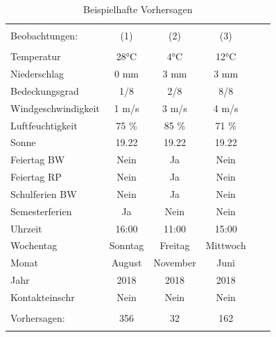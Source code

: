 \documentclass[a4paper,12pt]{thesis}
\begin{document}
\begin{table}[!htbp] \centering 
	\caption{Beispielhafte Vorhersagen} 
	\label{ForecastsExample} 
	\begin{tabular}{@{\extracolsep{-5pt}}lccccc} 
		\\[-1.8ex]\hline 
		\hline \\[-1.8ex] 
		Beobachtungen: & (1) & (2) & (3) \\ 
		\hline \\[-1.8ex] 
		Temperatur & 28°C & 4°C & 12°C\\
		Niederschlag & 0 mm & 3 mm &  3 mm\\
		Bedeckungsgrad & 1/8 & 2/8 & 8/8\\
		Windgeschwindigkeit &  1 m/s & 3 m/s & 4 m/s\\
		Luftfeuchtigkeit &  75 \% & 85 \% & 71 \% \\
		Sonne & 19.22 & 19.22 & 19.22\\
		Feiertag BW & Nein & Ja & Nein \\
		Feiertag RP & Nein & Ja & Nein \\
		Schulferien BW & Nein & Ja & Nein \\
		Semesterferien & Ja & Nein & Nein \\
		Uhrzeit & 16:00 & 11:00 & 15:00 \\
		Wochentag & Sonntag & Freitag & Mittwoch \\
		Monat & August & November & Juni \\
		Jahr & 2018 & 2018 & 2018 \\
		Kontakteinschr & Nein & Nein & Nein \\
		\hline \\[-1.8ex]
		Vorhersagen: & 356 & 32 & 162 \\ 
		\hline \\[-1.8ex] 
	\end{tabular} 
\end{table} 

\newpage
{}

\end{document}
